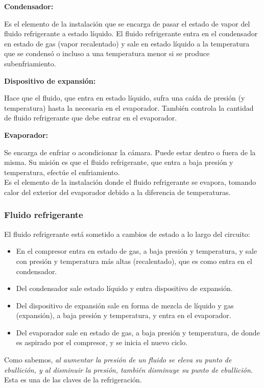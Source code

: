\textbf{Condensador:}

Es el elemento de la instalación que se encarga de pasar el estado de vapor del fluido refrigerante a estado líquido. El fluido refrigerante entra en el condensador en estado de gas (vapor recalentado) y sale en estado líquido a la temperatura que se condensó o incluso a una temperatura menor si se produce subenfriamiento.

\textbf{Dispositivo de expansión:}

Hace que el fluido, que entra en estado líquido, sufra una caída de presión (y temperatura) hasta la necesaria en el evaporador. También controla la cantidad de fluido refrigerante que debe entrar en el evaporador.

\textbf{Evaporador:}

Se encarga de enfriar o acondicionar la cámara. Puede estar dentro o fuera de la misma. Su misión es que el fluido refrigerante, que entra a baja presión y temperatura, efectúe el enfriamiento.\\
Es el elemento de la instalación donde el fluido refrigerante se evapora, tomando calor del exterior del evaporador debido a la diferencia de temperaturas.

\subsubsection{Fluido refrigerante}

El fluido refrigerante está sometido a cambios de estado a lo largo del circuito:

\begin{itemize}
	\item En el compresor entra en estado de gas, a baja presión y temperatura, y sale con presión y temperatura más altas (recalentado), que es como entra en el condensador.
	\item Del condensador sale estado líquido y entra dispositivo de expansión.
	\item Del dispositivo de expansión sale en forma de mezcla de líquido y gas (expansión), a baja presión y temperatura, y entra en el evaporador.
	\item Del evaporador sale en estado de gas, a baja presión y temperatura, de donde es aspirado por el compresor, y se inicia el nuevo ciclo.
\end{itemize}

Como sabemos, \textit{al aumentar la presión de un fluido se eleva su punto de ebullición, y al disminuir la presión, también disminuye su punto de ebullición.} Esta es una de las claves de la refrigeración.

